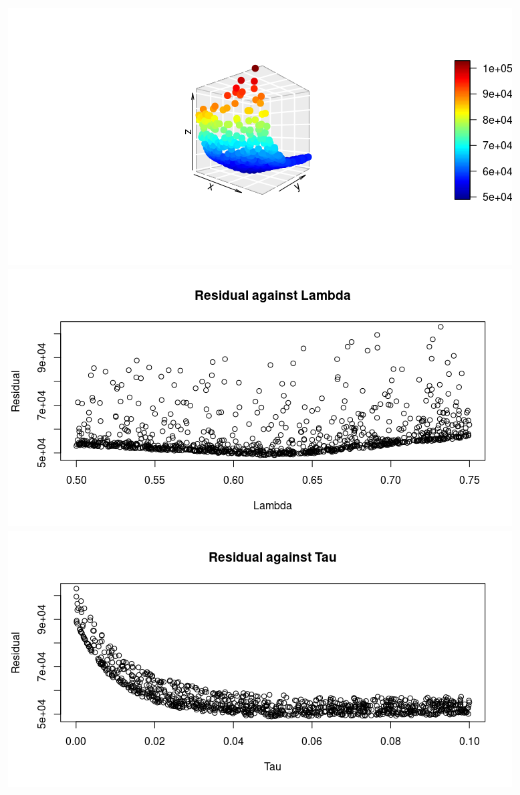 \documentclass{beamer}
\begin{document}
\begin{frame}
\begin{columns}
            \includegraphics[width=0.3\linewidth]{Parameter Estimation on Attempt _1/param_1/lam0_5-0_75tau0-0_1.png}
            \includegraphics[width=0.3\linewidth]{Parameter Estimation on Attempt _1/param_1/lam_3.png}
            \includegraphics[width=0.3\linewidth]{Parameter Estimation on Attempt _1/param_1/tau_3.png}
        \end{columns}

    \end{frame}
\end{document}

